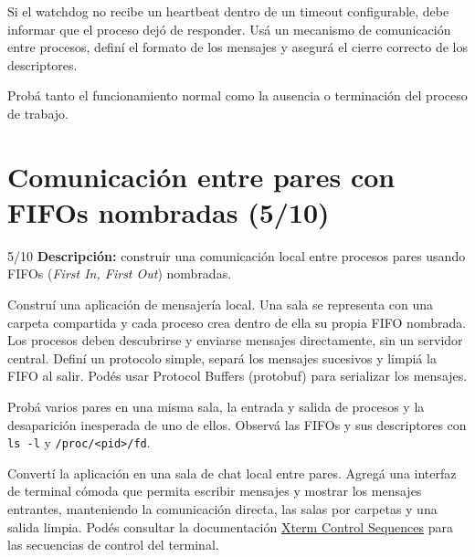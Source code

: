 \documentclass[11pt,a4paper]{article}
\begin{document}
Si el watchdog no recibe un heartbeat dentro de un timeout configurable, debe
informar que el proceso dejó de responder. Usá un mecanismo de comunicación
entre procesos, definí el formato de los mensajes y asegurá el cierre correcto
de los descriptores.

Probá tanto el funcionamiento normal como la ausencia o terminación del
proceso de trabajo.

\newpage
\section{Comunicación entre pares con FIFOs nombradas (5/10)}

\begin{trackbox}{5/10}
\textbf{Descripción:} construir una comunicación local entre procesos pares
usando FIFOs (\emph{First In, First Out}) nombradas.
\end{trackbox}

Construí una aplicación de mensajería local. Una sala se representa con una
carpeta compartida y cada proceso crea dentro de ella su propia FIFO nombrada.
Los procesos deben descubrirse y enviarse mensajes directamente, sin un
servidor central. Definí un protocolo simple, separá los mensajes sucesivos y
limpiá la FIFO al salir. Podés usar Protocol Buffers (protobuf) para
serializar los mensajes.

Probá varios pares en una misma sala, la entrada y salida de procesos y la
desaparición inesperada de uno de ellos. Observá las FIFOs y sus descriptores
con \texttt{ls -l} y \texttt{/proc/<pid>/fd}.

\begin{bonusbox}
Convertí la aplicación en una sala de chat local entre pares. Agregá una
interfaz de terminal cómoda que permita escribir mensajes y mostrar los
mensajes entrantes, manteniendo la comunicación directa, las salas por
carpetas y una salida limpia. Podés consultar la documentación
\href{https://www.xfree86.org/current/ctlseqs.html}{Xterm Control Sequences}
para las secuencias de control del terminal.
\end{bonusbox}
\end{document}

